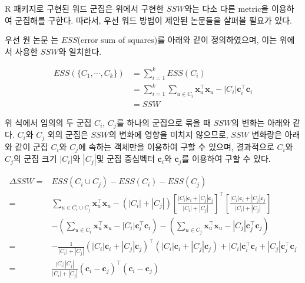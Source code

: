 \documentclass[
]{book}
\begin{document}
R 패키지로 구현된 워드 군집은 위에서 구현한 \(SSW\)와는 다소 다른 metric을 이용하여 군집해를 구한다. 따라서, 우선 워드 방법이 제안된 논문들을 살펴볼 필요가 있다.

우선 원 논문 \citet{ward1963hierarchical} 는 \(ESS\)(error sum of squares)를 아래와 같이 정의하였으며, 이는 위에서 사용한 \(SSW\)와 일치한다.

\begin{equation*}
\begin{split}
ESS(\{C_1, \cdots, C_k \}) &= \sum_{i = 1}^{k} ESS(C_i)\\
&= \sum_{i = 1}^{k} \sum_{u \in C_i} \mathbf{x}_u^\top \mathbf{x}_u - |C_i| \mathbf{c}_i^\top \mathbf{c}_i\\
&= SSW
\end{split}
\end{equation*}

위 식에서 임의의 두 군집 \(C_i\), \(C_j\)를 하나의 군집으로 묶을 때 \(SSW\)의 변화는 아래와 같다. \(C_i\)와 \(C_j\) 외의 군집은 \(SSW\)의 변화에 영향을 미치지 않으므로, \(SSW\) 변화량은 아래와 같이 군집 \(C_i\)와 \(C_j\)에 속하는 객체만을 이용하여 구할 수 있으며, 결과적으로 \(C_i\)와 \(C_j\)의 군집 크기 \(|C_i|\)와 \(|C_j|\)및 군집 중심벡터 \(\mathbf{c}_i\)와 \(\mathbf{c}_j\)를 이용하여 구할 수 있다.

\begin{equation}
\begin{split}
\Delta SSW =& ESS(C_i \cup C_j) - ESS(C_i) - ESS(C_j)\\
=& \sum_{u \in C_i \cup C_j} \mathbf{x}_u^\top \mathbf{x}_u - (|C_i| + |C_j|)\left[\frac{|C_i|\mathbf{c}_i + |C_j|\mathbf{c}_j}{|C_i| + |C_j|}\right]^\top \left[\frac{|C_i|\mathbf{c}_i + |C_j|\mathbf{c}_j}{|C_i| + |C_j|}\right]\\
& - \left( \sum_{u \in C_i} \mathbf{x}_u^\top \mathbf{x}_u - |C_i| \mathbf{c}_i^\top \mathbf{c}_i \right) - \left( \sum_{u \in C_j} \mathbf{x}_u^\top \mathbf{x}_u - |C_j| \mathbf{c}_j^\top \mathbf{c}_j \right)\\
=& -\frac{1}{|C_i| + |C_j|} \left( |C_i|\mathbf{c}_i + |C_j|\mathbf{c}_j \right)^\top \left( |C_i|\mathbf{c}_i + |C_j|\mathbf{c}_j \right) + |C_i| \mathbf{c}_i^\top \mathbf{c}_i + |C_j| \mathbf{c}_j^\top \mathbf{c}_j\\
=& \frac{|C_i||C_j|}{|C_i| + |C_j|} \left(\mathbf{c}_i - \mathbf{c}_j\right)^\top \left(\mathbf{c}_i - \mathbf{c}_j\right)
\end{split}
\label{eq:ward-minimand}
\end{equation}
\end{document}
